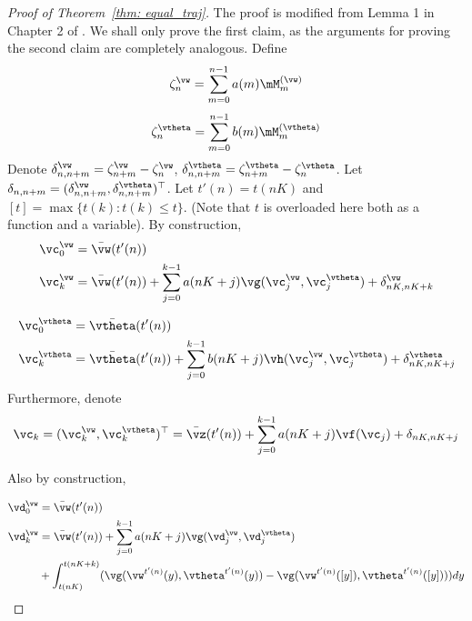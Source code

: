 \documentclass{article}
\def\thmref#1{Theorem~\ref{#1}}
\begin{document}
\begin{proof}[Proof of \thmref{thm: equal_traj}]
The proof is modified from Lemma 1 in Chapter 2 of \citep{borkar2009stochastic}.
		We shall only prove the first claim, as the arguments for proving the second claim are completely analogous. 
		Define 
		\begin{equation}
		\zeta^\vw_n=\sum_{m=0}^{n-1}a(m)\mM_{m}^{(\vw)}
		\end{equation}
		\begin{equation}
		\zeta^\vtheta_n=\sum_{m=0}^{n-1}b(m)\mM_{m}^{(\vtheta)}
		\end{equation}
		 Denote $\delta^{\vw}_{n,n+m}=\zeta^{\vw}_{n+m}-\zeta^{\vw}_n$, $\delta^{\vtheta}_{n,n+m}=\zeta^{\vtheta}_{n+m}-\zeta^{\vtheta}_n$. Let $\delta_{n,n+m} = (\delta^{\vw}_{n,n+m},\delta^{\vtheta}_{n,n+m})^\top$. Let  $t'(n)=t(nK)$ and $[t]=\max\{t(k): t(k)\leq t\}$. (Note that $t$ is overloaded here both as a function and a variable). By construction,
		\begin{equation}
		\begin{split}
		&\vc^{\vw}_0 = \bar{\vw}(t'(n))\\
		&\vc^{\vw}_k = \bar{\vw}(t'(n))  +\sum_{j=0}^{k-1} a(nK+j)\vg(\vc^{\vw}_{j}, \vc^{\vtheta}_{j}) + \delta^{\vw}_{nK,nK+k}
		\end{split}
		\end{equation}
		
		\begin{equation}
		\begin{split}
		&\vc^{\vtheta}_0 = \bar{\vtheta}(t'(n))\\
		&\vc^{\vtheta}_k = \bar{\vtheta}(t'(n))  +\sum_{j=0}^{k-1} b(nK+j)\vh(\vc^{\vw}_{j}, \vc^{\vtheta}_{j}) + \delta^{\vtheta}_{nK,nK+j}
		\end{split}
		\label{eq: recons_seq1t}
		\end{equation}
		Furthermore, denote
		\begin{equation}
		\vc_k=(\vc^{\vw}_k, \vc^{\vtheta}_k)^\top=\bar{\vz}(t'(n))+\sum_{j=0}^{k-1}a(nK+j)\vf(\vc_j)+\delta_{nK,nK+j}
		\label{eq: recons_seq1}
		\end{equation}
		
		Also by construction,
		
		\begin{equation}
		\begin{split}
		\vd^{\vw}_0 &= \bar{\vw}(t'(n))\\
		\vd^{\vw}_k &=\bar{\vw}(t'(n))+\sum_{j=0}^{k-1} a(nK+j)\vg(\vd^{\vw}_{j}, \vd^{\vtheta}_{j})\\
		&+\int_{t(nK)}^{t(nK+k)}(\vg( \vw^{t'(n)}(y),\vtheta^{t'(n)}(y))-\vg( \vw^{t'(n)}([y]),  \vtheta^{t'(n)}([y])))dy
		\end{split}
		\end{equation}
		

\end{proof}
\end{document}
